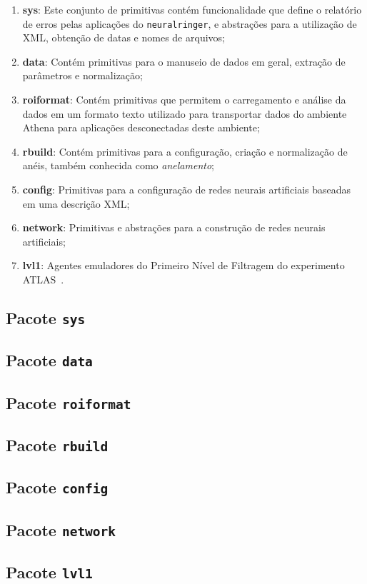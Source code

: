 \begin{enumerate}
\item \textbf{sys}: Este conjunto de primitivas contém funcionalidade que
define o relatório de erros pelas aplicações do \texttt{neuralringer}, e
abstrações para a utilização de  XML, obtenção de datas e nomes de
arquivos;
\item \textbf{data}: Contém primitivas para o manuseio de dados em geral,
extração de parâmetros e normalização;
\item \textbf{roiformat}: Contém primitivas que permitem o carregamento e
análise da dados em um formato texto utilizado para transportar dados do
ambiente Athena para aplicações desconectadas deste ambiente;
\item \textbf{rbuild}: Contém primitivas para a configuração, criação e
normalização de anéis, também conhecida como \textit{anelamento};
\item \textbf{config}: Primitivas para a configuração de redes neurais
artificiais baseadas em uma descrição XML;
\item \textbf{network}: Primitivas e abstrações para a construção de redes
neurais artificiais;
\item \textbf{lvl1}: Agentes emuladores do Primeiro Nível de Filtragem do
experimento ATLAS~\cite{l1-tdr}.
\end{enumerate}

\subsection{Pacote \texttt{sys}}

\subsection{Pacote \texttt{data}}

\subsection{Pacote \texttt{roiformat}}

\subsection{Pacote \texttt{rbuild}}

\subsection{Pacote \texttt{config}}

\subsection{Pacote \texttt{network}}

\subsection{Pacote \texttt{lvl1}}

